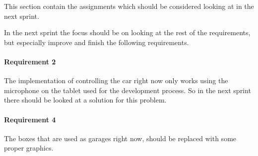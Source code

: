 This section contain the assignments which should be considered looking at in the next sprint.

In the next sprint the focus should be on looking at the rest of the requirements, but especially improve and finish the following requirements.

\paragraph{Requirement 2}
The implementation of controlling the car right now only works using the microphone on the tablet used for the development process.
So in the next sprint there should be looked at a solution for this problem.
\paragraph{Requirement 4}
The boxes that are used as garages right now, should be replaced with some proper graphics.